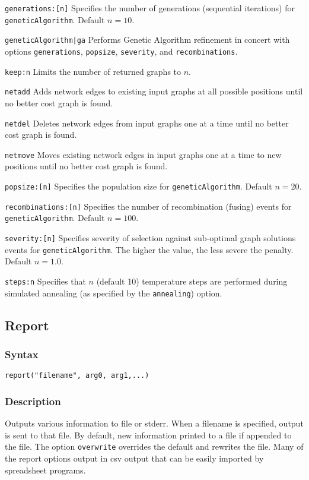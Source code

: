 \documentclass[11pt]{article}
\begin{document}
			\smallskip		
			\smallskip		
			\noindent \texttt{generations:[n]} Specifies the number of generations (sequential iterations) for \texttt{geneticAlgorithm}. Default $n=10$.
			
			\smallskip		
			\noindent \texttt{geneticAlgorithm|ga} Performs Genetic Algorithm \citep{Holland1975} refinement in concert with options \texttt{generations}, \texttt{popsize}, \texttt{severity}, and \texttt{recombinations}.  
			
			\smallskip		
			\noindent \texttt{keep:n} Limits the number of returned graphs to $n$.  
		
			\smallskip		
			\noindent \texttt{netadd} Adds network edges to existing input graphs at all possible positions until no better cost graph is found.
			
			\smallskip
			\noindent \texttt{netdel} Deletes network edges from input graphs one at a time until no better cost graph is found.
			
			\smallskip
			\noindent \texttt{netmove} Moves existing network edges in input graphs one at a time to new positions until no better cost graph is found.
			
			\smallskip		
			\noindent \texttt{popsize:[n]} Specifies the population size for \texttt{geneticAlgorithm}. Default $n=20$.
			
			\smallskip		
			\noindent \texttt{recombinations:[n]} Specifies the number of recombination (fusing) events for \texttt{geneticAlgorithm}. Default $n=100$.
			
			\smallskip		
			\noindent \texttt{severity:[n]} Specifies severity of selection against sub-optimal graph solutions events for \texttt{geneticAlgorithm}. The higher the value, the less severe the penalty. Default $n=1.0$.
			
			\smallskip		
			\noindent \texttt{steps:n} Specifies that $n$ (default 10) temperature steps are performed during simulated annealing (as specified by the \texttt{annealing}) option.
			
	\subsection{Report}
		\subsubsection{Syntax}
				\texttt{report("filename", arg0, arg1,...)}
		\subsubsection{Description}
			Outputs various information to file or stderr.  When a filename is specified, output is sent to that file.  By default, new information printed to a file
			if appended to the file.  The option \texttt{overwrite} overrides the default and rewrites the file.  Many of the report options output in csv output that
			can be easily imported by spreadsheet programs.
\end{document}
